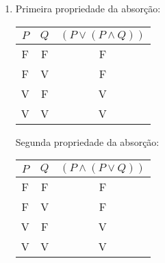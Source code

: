 \documentclass[12pt, letterpaper]{report}
\begin{document}
\begin{enumerate}[label=\arabic*.]
    \item Primeira propriedade da absorção:
            \begin{table}[ht!]
            \centering
            \begin{tabular}{| c | c | c |}
              \hline
              $ P $ & $ Q $ & $ (P \lor (P \land Q)) $ \\
              \hline
              F & F & F \\ \hline
              F & V & F \\ \hline
              V & F & V \\ \hline
              V & V & V \\ \hline
            \end{tabular}
            \end{table}

        Segunda propriedade da absorção:
            \begin{table}[ht!]
            \centering
            \begin{tabular}{| c | c | c |}
              \hline
              $ P $ & $ Q $ & $ (P \land (P \lor Q)) $ \\
              \hline
              F & F & F \\ \hline
              F & V & F \\ \hline
              V & F & V \\ \hline
              V & V & V \\ \hline
            \end{tabular}
            \end{table}

  \end{enumerate}
\end{document}
